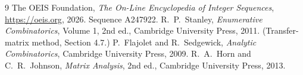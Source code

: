 \documentclass[11pt,a4paper]{article}
\theoremstyle{plain}
\theoremstyle{definition}
\begin{document}
\begin{thebibliography}{9}
 The OEIS Foundation, \emph{The On-Line Encyclopedia of Integer
Sequences}, \url{https://oeis.org}, 2026. Sequence A247922.
 R.~P.~Stanley, \emph{Enumerative Combinatorics}, Volume 1, 2nd ed.,
Cambridge University Press, 2011. (Transfer-matrix method, Section 4.7.)
 P.~Flajolet and R.~Sedgewick, \emph{Analytic Combinatorics}, Cambridge
University Press, 2009.
 R.~A.~Horn and C.~R.~Johnson, \emph{Matrix Analysis}, 2nd ed., Cambridge
University Press, 2013.
\end{thebibliography}
\end{document}
